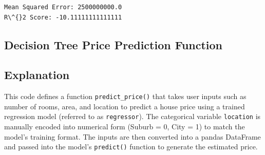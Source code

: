 \documentclass[11pt,a4paper]{report}
\begin{document}
    \begin{Verbatim}[commandchars=\\\{\}]
Mean Squared Error: 2500000000.0
R\^{}2 Score: -10.11111111111111
    \end{Verbatim}


\subsection{Decision Tree Price Prediction Function}

\subsection*{Explanation}
This code defines a function \texttt{predict\_price()} that takes user inputs such as number of rooms, area, and location to predict a house price using a trained regression model (referred to as \texttt{regressor}). The categorical variable \texttt{location} is manually encoded into numerical form (Suburb = 0, City = 1) to match the model’s training format. The inputs are then converted into a pandas DataFrame and passed into the model’s \texttt{predict()} function to generate the estimated price.
\end{document}
